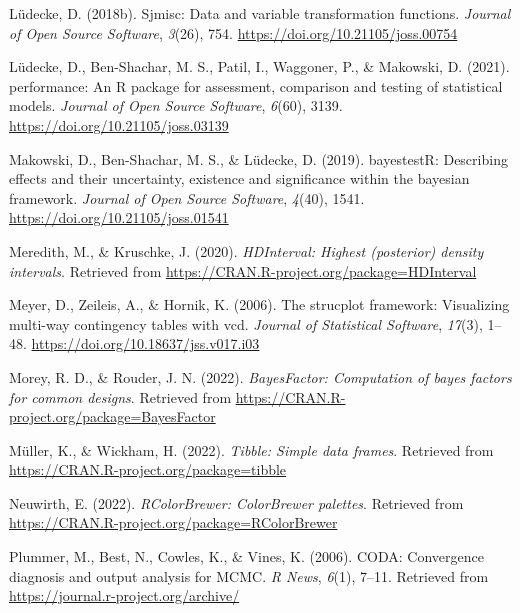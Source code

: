 \documentclass[
  english,
  man]{apa6}
\newlength{\cslhangindent}
\newlength{\cslentryspacingunit} %
\newenvironment{CSLReferences}[2] %
 {%
  \setlength{\parindent}{0pt}
  \ifodd #1
  \let\oldpar\par
  \def\par{\hangindent=\cslhangindent\oldpar}
  \fi
  \setlength{\parskip}{#2\cslentryspacingunit}
 }%
 {}
\begin{document}
\begin{CSLReferences}{1}{0}
\leavevmode{}%
Lüdecke, D. (2018b). Sjmisc: Data and variable transformation functions. \emph{Journal of Open Source Software}, \emph{3}(26), 754. \url{https://doi.org/10.21105/joss.00754}

\leavevmode{}%
Lüdecke, D., Ben-Shachar, M. S., Patil, I., Waggoner, P., \& Makowski, D. (2021). {performance}: An {R} package for assessment, comparison and testing of statistical models. \emph{Journal of Open Source Software}, \emph{6}(60), 3139. \url{https://doi.org/10.21105/joss.03139}

\leavevmode{}%
Makowski, D., Ben-Shachar, M. S., \& Lüdecke, D. (2019). bayestestR: Describing effects and their uncertainty, existence and significance within the bayesian framework. \emph{Journal of Open Source Software}, \emph{4}(40), 1541. \url{https://doi.org/10.21105/joss.01541}

\leavevmode{}%
Meredith, M., \& Kruschke, J. (2020). \emph{HDInterval: Highest (posterior) density intervals}. Retrieved from \url{https://CRAN.R-project.org/package=HDInterval}

\leavevmode{}%
Meyer, D., Zeileis, A., \& Hornik, K. (2006). The strucplot framework: Visualizing multi-way contingency tables with vcd. \emph{Journal of Statistical Software}, \emph{17}(3), 1--48. \url{https://doi.org/10.18637/jss.v017.i03}

\leavevmode{}%
Morey, R. D., \& Rouder, J. N. (2022). \emph{BayesFactor: Computation of bayes factors for common designs}. Retrieved from \url{https://CRAN.R-project.org/package=BayesFactor}

\leavevmode{}%
Müller, K., \& Wickham, H. (2022). \emph{Tibble: Simple data frames}. Retrieved from \url{https://CRAN.R-project.org/package=tibble}

\leavevmode{}%
Neuwirth, E. (2022). \emph{RColorBrewer: ColorBrewer palettes}. Retrieved from \url{https://CRAN.R-project.org/package=RColorBrewer}

\leavevmode{}%
Plummer, M., Best, N., Cowles, K., \& Vines, K. (2006). CODA: Convergence diagnosis and output analysis for MCMC. \emph{R News}, \emph{6}(1), 7--11. Retrieved from \url{https://journal.r-project.org/archive/}


\end{CSLReferences}
\end{document}
